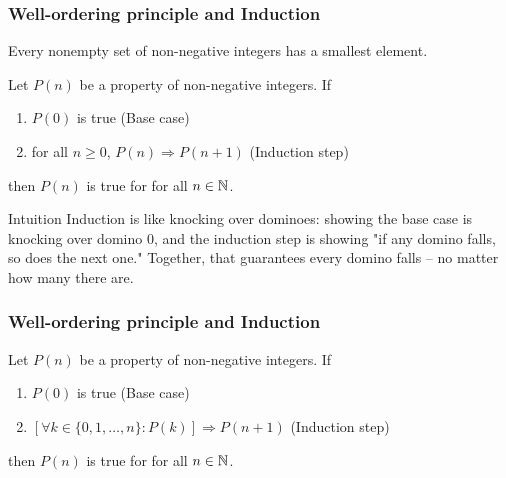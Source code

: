  \begin{frame}[fragile]
\frametitle{Well-ordering principle and Induction}
\begin{axiom}[WOP]
Every nonempty set of non-negative integers has a smallest element. 
\end{axiom}


\begin{axiom}[Induction]
Let $P(n)$ be a property of non-negative integers. If
\begin{enumerate}
\item $P(0)$ is true (Base case)
\item for all $n \geq 0$, $P(n) \Rightarrow P(n+1)$ (Induction step)
\end{enumerate}
then $P(n)$ is true for for all $n \in {{\mathbb{N}}}$.
\end{axiom}

\begin{block}{Intuition}
Induction is like knocking over dominoes: showing the base case is knocking over domino 0, and the induction step is showing "if any domino falls, so does the next one." Together, that guarantees every domino falls -- no matter how many there are.
\end{block}

\end{frame}


 \begin{frame}[fragile]
\frametitle{Well-ordering principle and Induction}
\begin{axiom}
Let $P(n)$ be a property of non-negative integers. If 
\begin{enumerate}
\item $P(0)$ is true (Base case)
\item $[\forall k \in \{0,1, \ldots, n\}: P(k)] \Rightarrow P(n+1)$ (Induction step)
\end{enumerate}
then $P(n)$ is true for for all $n \in {{\mathbb{N}}}$.
\end{axiom}
\end{frame}

